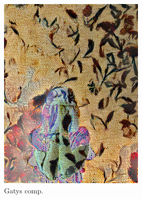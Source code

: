 \begin{figure}[]
\begin{subfigure}{\textwidth}
\begin{subfigure}{0.24\textwidth}
            \includegraphics[width=\textwidth]{images/04-experiment02/human/flowers2/gatys_im.jpg}
            \caption*{Gatys comp.}
        \end{subfigure}
        \hfill
        \begin{subfigure}{0.24\textwidth}
            \centering

\end{subfigure}
\end{subfigure}
\end{figure}
